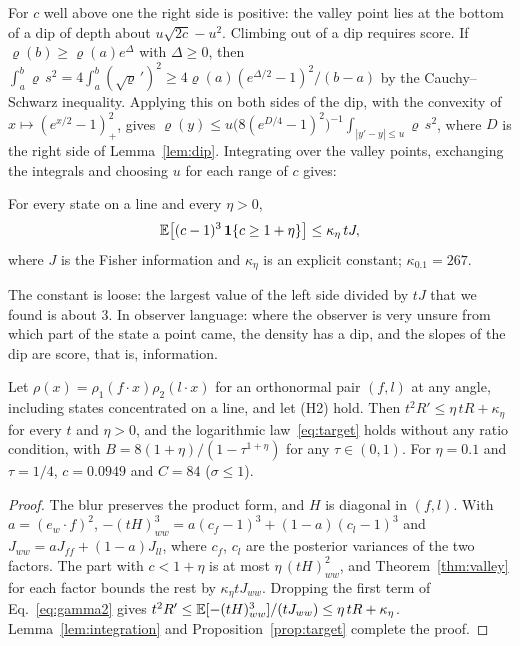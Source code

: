 For $c$ well above one the right side is positive: the valley point lies at the bottom of a dip of depth about $u\sqrt{2c} - u^2$. Climbing out of a dip requires score. If $\varrho(b) \geq \varrho(a)e^{\Delta}$ with $\Delta \geq 0$, then $\int_a^b \varrho\,s^2 = 4\int_a^b (\sqrt\varrho\,')^2 \geq 4\varrho(a)(e^{\Delta/2} - 1)^2/(b - a)$ by the Cauchy--Schwarz inequality. Applying this on both sides of the dip, with the convexity of $x \mapsto (e^{x/2}-1)_+^2$, gives $\varrho(y) \leq u\big(8(e^{D/4} - 1)^2\big)^{-1}\int_{|y'-y| \leq u}\varrho\,s^2$, where $D$ is the right side of Lemma~\ref{lem:dip}. Integrating over the valley points, exchanging the integrals and choosing $u$ for each range of $c$ gives:

\begin{theorem}
\label{thm:valley}
For every state on a line and every $\eta > 0$,
\begin{equation}
\mathbb{E}\big[(c - 1)^3\,\mathbf{1}\{c \geq 1 + \eta\}\big] \leq \kappa_\eta\, t J,
\end{equation}
where $J$ is the Fisher information and $\kappa_\eta$ is an explicit constant; $\kappa_{0.1} = 267$.
\end{theorem}

The constant is loose: the largest value of the left side divided by $tJ$ that we found is about $3$. In observer language: where the observer is very unsure from which part of the state a point came, the density has a dip, and the slopes of the dip are score, that is, information.

\begin{theorem}
\label{thm:product}
Let $\rho(x) = \rho_1(f\cdot x)\rho_2(l\cdot x)$ for an orthonormal pair $(f, l)$ at any angle, including states concentrated on a line, and let (H2) hold. Then $t^2R' \leq \eta\,tR + \kappa_\eta$ for every $t$ and $\eta > 0$, and the logarithmic law~\eqref{eq:target} holds without any ratio condition, with $B = 8(1+\eta)/(1-\tau^{1+\eta})$ for any $\tau \in (0,1)$. For $\eta = 0.1$ and $\tau = 1/4$, $c = 0.0949$ and $C = 84$ ($\sigma \leq 1$).
\end{theorem}

\begin{proof}
The blur preserves the product form, and $H$ is diagonal in $(f, l)$. With $a = (e_w\cdot f)^2$, $-(tH)^3_{ww} = a(c_f - 1)^3 + (1-a)(c_l - 1)^3$ and $J_{ww} = aJ_{ff} + (1-a)J_{ll}$, where $c_f$, $c_l$ are the posterior variances of the two factors. The part with $c < 1 + \eta$ is at most $\eta\,(tH)^2_{ww}$, and Theorem~\ref{thm:valley} for each factor bounds the rest by $\kappa_\eta tJ_{ww}$. Dropping the first term of Eq.~\eqref{eq:gamma2} gives $t^2R' \leq \mathbb{E}[-(tH)^3_{ww}]/(tJ_{ww}) \leq \eta\,tR + \kappa_\eta$. Lemma~\ref{lem:integration} and Proposition~\ref{prop:target} complete the proof.
\end{proof}

